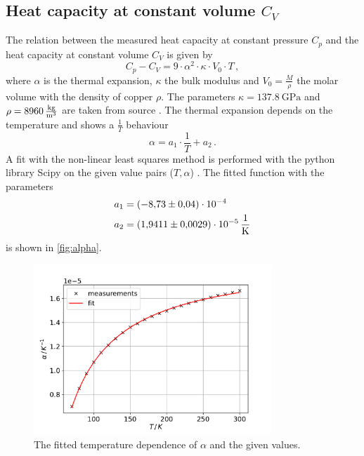 \subsection{Heat capacity at constant volume $C_V$}
The relation between the measured heat capacity at constant pressure $C_p$ and the heat capacity at constant volume $C_V$ is given by  %
\begin{equation}
        C_p - C_V = 9 \cdot \alpha^2 \cdot \kappa \cdot V_0 \cdot T \, ,
        \label{eqn:C_relation}
\end{equation}
where $\alpha$ is the thermal expansion, $\kappa$ the bulk modulus and $V_0 = \frac{M}{\rho}$ the molar volume with the density of copper $\rho$.
The parameters $\kappa = \qty{137.8}{\giga\pascal}$ and $\rho = \qty{8960}{\frac{\kilogram}{\metre^3}}$ are taken from source \cite{goodfellow}.
The thermal expansion depends on the temperature and shows a $\frac{1}{T}$ behaviour
\begin{equation}
    \alpha = a_1 \cdot \frac{1}{T} + a_2 \, .
\end{equation}
A fit with the non-linear least squares method is performed with the python library Scipy\cite{scipy} on the given value pairs ($T, \alpha$) \cite{V47}.
The fitted function with the parameters
\begin{align*}
    a_1 &= \qty{-8.73(4)e-04}{} \\
    a_2 &= \qty{1.9411(29)e-05}{\frac{1}{\kelvin}}
\end{align*}
is shown in \autoref{fig:alpha}.
\begin{figure}
    \centering
    \includegraphics[width=0.8\textwidth]{content/plots/temperature_progress.pdf}
    \caption{The fitted temperature dependence of $\alpha$ and the given values.}
    \label{fig:alpha}
\end{figure}
